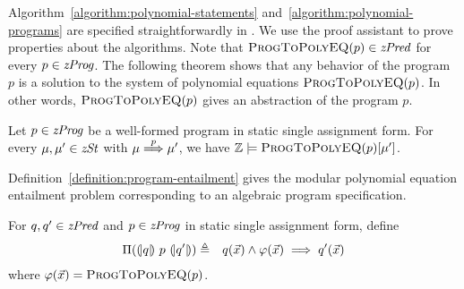 Algorithm~\ref{algorithm:polynomial-statements}
and~\ref{algorithm:polynomial-programs} are specified straightforwardly
in \gallina. We use the proof assistant \coq to prove properties
about the algorithms. Note that $\textsc{ProgToPolyEQ}(p) \in
\mathit{zPred}$ for every $p \in \mathit{zProg}$. The following theorem shows that any
behavior of the program $p$ is a solution to the system of polynomial
equations $\textsc{ProgToPolyEQ}(p)$. In other words,
$\textsc{ProgToPolyEQ}(p)$ gives an abstraction of the program $p$.

\begin{theorem}
  Let $p \in \mathit{zProg}$ be a well-formed program in static single assignment
  form. For every $\mu, \mu' \in \mathit{zSt}$ with $\mu \overset{p}{\Longrightarrow} \mu'$,
  we have $\mathbb{Z} \models \textsc{ProgToPolyEQ}(p) [\mu']$.
\end{theorem}

Definition~\ref{definition:program-entailment} gives the modular
polynomial equation entailment problem corresponding to an algebraic
program specification.
\begin{definition}
  For $q, q' \in \mathit{zPred}$ and $p \in \mathit{zProg}$ in static single assignment
  form, define
  \begin{eqnarray*}
    \Pi({(\!|}{q}{|\!)}~{p}~{(\!|}{q'}{|\!)}) & \triangleq &
    q(\vec{x}) \wedge \varphi(\vec{x}) \implies q'(\vec{x})
  \end{eqnarray*}
  where $\varphi(\vec{x}) =
  \textsc{ProgToPolyEQ}(p)$.
  \label{definition:program-entailment}
\end{definition}

